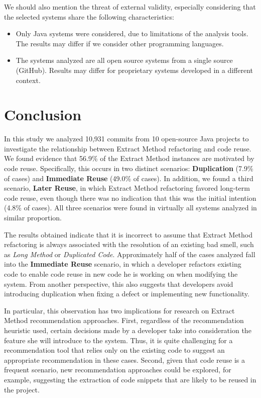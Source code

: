 We should also mention the threat of external validity, especially considering that the selected systems share the following characteristics:
\begin {itemize}
\item Only Java systems were considered, due to limitations of the analysis tools. The results may differ if we consider other programming languages.

\item The systems analyzed are all open source systems from a single source (GitHub). Results may differ for proprietary systems developed in a different context.
\end{itemize}


\section{Conclusion}
\label{sconclusao}

In this study we analyzed 10,931 commits from 10 open-source Java projects to investigate the relationship between Extract Method refactoring and code reuse. We found evidence that 56.9\% of the Extract Method instances are motivated by code reuse. Specifically, this occurs in two distinct scenarios: \textbf{Duplication} (7.9\% of cases) and \textbf{Immediate Reuse} (49.0\% of cases).
In addition, we found a third scenario, \textbf{Later Reuse}, in which Extract Method refactoring favored long-term code reuse, even though there was no indication that this was the initial intention (4.8\% of cases).
All three scenarios were found in virtually all systems analyzed in similar proportion.

The results obtained indicate that it is incorrect to assume that Extract Method refactoring is always associated with the resolution of an existing bad smell, such as \emph{Long Method} or \emph{Duplicated Code}. Approximately half of the cases analyzed fall into the \textbf{Immediate Reuse} scenario, in which a developer refactors existing code to enable code reuse in new code he is working on when modifying the system.
From another perspective, this also suggests that developers avoid introducing duplication when fixing a defect or implementing new functionality.

In particular, this observation has two implications for research on Extract Method recommendation approaches. First, regardless of the recommendation heuristic used, certain decisions made by a developer take into consideration the feature she will introduce to the system. Thus, it is quite challenging for a recommendation tool that relies only on the existing code to suggest an appropriate recommendation in these cases.
Second, given that code reuse is a frequent scenario, new recommendation approaches could be explored, for example, suggesting the extraction of code snippets that are likely to be reused in the project.
